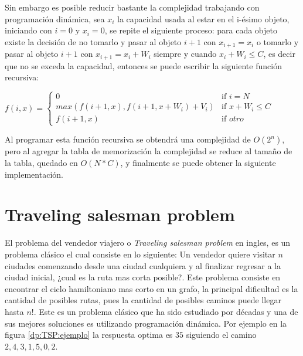 \documentclass[12pt, a4paper]{article}
\newcommand\cppfile[2][]{

}
\begin{document}
	Sin embargo es posible reducir bastante la complejidad trabajando con programación dinámica, sea $x_{i}$ la 
	capacidad usada al estar en el i-ésimo objeto, iniciando con $i=0$ y $x_{i}=0$, se repite el siguiente proceso: 
	para cada objeto existe la decisión de no tomarlo y pasar al objeto $i+1$ con $x_{i+1}=x_{i}$ o tomarlo y pasar 
	al objeto $i+1$ con $x_{i+1}=x_{i}+W_{i}$ siempre y cuando $x_{i}+W_{i} \leq C$, es decir que no se exceda la 
	capacidad, entonces se puede escribir la siguiente función recursiva:
	\begin{center}
		$f(i, x) = 	
		\begin{cases}
			0 & \text{if } i = N\\
			max(f(i+1,x), f(i+1,x+W_{i}) + V_{i}) & \text{if } x+W_{i} \leq C \\
			f(i+1,x) & \text{if $otro$}
		\end{cases}
		$\\
	\end{center}
	
	Al programar esta función recursiva se obtendrá una complejidad de $O(2^{n})$, pero al agregar la tabla de 
	memorización la complejidad se reduce al tamaño de la tabla, quedado en $O(N*C)$, y finalmente se puede obtener 
	la siguiente implementación.
	\cppfile[9-17]{Programacion_dinamica/codigos/ProblemaMochila.cpp}
	
	\section{Traveling salesman problem}
	\label{dp:TSP}
	
	El problema del vendedor viajero o \textit{Traveling salesman problem} en ingles, es un problema clásico el cual 
	consiste en lo siguiente: Un vendedor quiere visitar $n$ ciudades comenzando desde una ciudad cualquiera y al 
	finalizar regresar a la ciudad inicial, ¿cual es la ruta mas corta posible?. Este problema consiste en encontrar
	el ciclo hamiltoniano mas corto en un grafo, la principal dificultad es la cantidad de posibles rutas, pues la 
	cantidad de posibles caminos puede llegar hasta $n!$. Este es un problema clásico que ha sido estudiado por 
	décadas y una de sus mejores soluciones es utilizando programación dinámica. Por ejemplo en la figura 
	\ref{dp:TSP:ejemplo} la respuesta optima es $35$ siguiendo el camino $2,4,3,1,5,0,2$.\\
	
\end{document}
